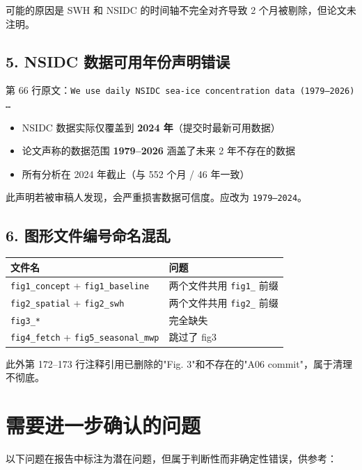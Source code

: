 \documentclass[11pt,a4paper]{article}
\begin{document}
可能的原因是 SWH 和 NSIDC 的时间轴不完全对齐导致 2 个月被剔除，但论文未注明。

\subsection*{5. NSIDC 数据可用年份声明错误}

第 66 行原文：\texttt{We use daily NSIDC sea-ice concentration data (1979--2026) \ldots}

\begin{itemize}
\item NSIDC 数据实际仅覆盖到 \textbf{2024 年}（提交时最新可用数据）
\item 论文声称的数据范围 \textbf{1979--2026} 涵盖了未来 2 年不存在的数据
\item 所有分析在 2024 年截止（与 552 个月 / 46 年一致）
\end{itemize}

此声明若被审稿人发现，会严重损害数据可信度。应改为 \texttt{1979--2024}。

\subsection*{6. 图形文件编号命名混乱}

\begin{tabularx}{\textwidth}{lX}
\toprule
\textbf{文件名} & \textbf{问题} \\
\midrule
\texttt{fig1\_concept} + \texttt{fig1\_baseline} & 两个文件共用 \texttt{fig1\_} 前缀 \\
\texttt{fig2\_spatial} + \texttt{fig2\_swh} & 两个文件共用 \texttt{fig2\_} 前缀 \\
\texttt{fig3\_*} & 完全缺失 \\
\texttt{fig4\_fetch} + \texttt{fig5\_seasonal\_mwp} & 跳过了 fig3 \\
\bottomrule
\end{tabularx}

此外第 172--173 行注释引用已删除的"Fig. 3"和不存在的"A06 commit"，属于清理不彻底。

\section{需要进一步确认的问题}

以下问题在报告中标注为潜在问题，但属于判断性而非确定性错误，供参考：
\end{document}
